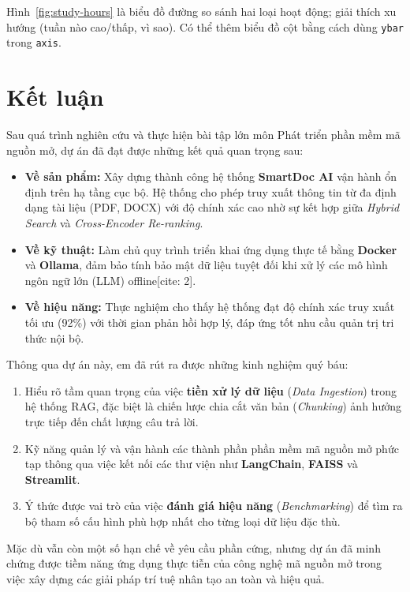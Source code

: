 \documentclass[10pt, conference, a4paper, compsocconf]{IEEEtran}
\begin{document}
Hình~\ref{fig:study-hours} là biểu đồ đường so sánh hai loại hoạt động; giải thích xu hướng (tuần nào cao/thấp, vì sao). Có thể thêm biểu đồ cột bằng cách dùng \texttt{ybar} trong \texttt{axis}.

\section{Kết luận}

Sau quá trình nghiên cứu và thực hiện bài tập lớn môn Phát triển phần mềm mã nguồn mở, dự án đã đạt được những kết quả quan trọng sau:

\begin{itemize}
    \item \textbf{Về sản phẩm:} Xây dựng thành công hệ thống \textbf{SmartDoc AI} vận hành ổn định trên hạ tầng cục bộ. Hệ thống cho phép truy xuất thông tin từ đa định dạng tài liệu (PDF, DOCX) với độ chính xác cao nhờ sự kết hợp giữa \textit{Hybrid Search} và \textit{Cross-Encoder Re-ranking}.
    \item \textbf{Về kỹ thuật:} Làm chủ quy trình triển khai ứng dụng thực tế bằng \textbf{Docker} và \textbf{Ollama}, đảm bảo tính bảo mật dữ liệu tuyệt đối khi xử lý các mô hình ngôn ngữ lớn (LLM) offline[cite: 2]. 
    \item \textbf{Về hiệu năng:} Thực nghiệm cho thấy hệ thống đạt độ chính xác truy xuất tối ưu (92\%) với thời gian phản hồi hợp lý, đáp ứng tốt nhu cầu quản trị tri thức nội bộ.
\end{itemize}

Thông qua dự án này, em đã rút ra được những kinh nghiệm quý báu:
\begin{enumerate}
    \item Hiểu rõ tầm quan trọng của việc \textbf{tiền xử lý dữ liệu} (\textit{Data Ingestion}) trong hệ thống RAG, đặc biệt là chiến lược chia cắt văn bản (\textit{Chunking}) ảnh hưởng trực tiếp đến chất lượng câu trả lời.
    \item Kỹ năng quản lý và vận hành các thành phần phần mềm mã nguồn mở phức tạp thông qua việc kết nối các thư viện như \textbf{LangChain}, \textbf{FAISS} và \textbf{Streamlit}.
    \item Ý thức được vai trò của việc \textbf{đánh giá hiệu năng} (\textit{Benchmarking}) để tìm ra bộ tham số cấu hình phù hợp nhất cho từng loại dữ liệu đặc thù.
\end{enumerate}

Mặc dù vẫn còn một số hạn chế về yêu cầu phần cứng, nhưng dự án đã minh chứng được tiềm năng ứng dụng thực tiễn của công nghệ mã nguồn mở trong việc xây dựng các giải pháp trí tuệ nhân tạo an toàn và hiệu quả.
\end{document}
